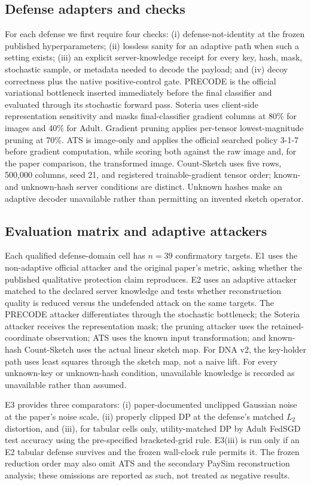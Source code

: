 \subsection{Defense adapters and checks}
For each defense we first require four checks: (i) defense-not-identity at the
frozen published hyperparameters; (ii) lossless sanity for an adaptive path
when such a setting exists; (iii) an explicit server-knowledge receipt for
every key, hash, mask, stochastic sample, or metadata needed to decode the
payload; and (iv) decoy correctness plus the native positive-control gate.
PRECODE is the official variational bottleneck inserted immediately before the
final classifier and evaluated through its stochastic forward pass.  Soteria
uses client-side representation sensitivity and masks final-classifier gradient
columns at 80\% for images and 40\% for Adult.  Gradient pruning applies
per-tensor lowest-magnitude pruning at 70\%.  ATS is image-only and applies the
official searched policy 3-1-7 before gradient computation, while scoring both
against the raw image and, for the paper comparison, the transformed image.
Count-Sketch uses five rows, 500,000 columns, seed 21, and registered
trainable-gradient tensor order; known- and unknown-hash server conditions are
distinct.  Unknown hashes make an adaptive decoder unavailable rather than
permitting an invented sketch operator.

\subsection{Evaluation matrix and adaptive attackers}
Each qualified defense-domain cell has $n=39$ confirmatory targets.  E1 uses
the non-adaptive official attacker and the original paper's metric, asking
whether the published qualitative protection claim reproduces.  E2 uses an
adaptive attacker matched to the declared server knowledge and tests whether
reconstruction quality is reduced versus the undefended attack on the same
targets.  The PRECODE attacker differentiates through the stochastic
bottleneck; the Soteria attacker receives the representation mask; the pruning
attacker uses the retained-coordinate observation; ATS uses the known input
transformation; and known-hash Count-Sketch uses the actual linear sketch map.
For DNA v2, the key-holder path uses least squares through the sketch map, not
a naive lift.  For every unknown-key or unknown-hash condition, unavailable
knowledge is recorded as unavailable rather than assumed.

E3 provides three comparators: (i) paper-documented unclipped Gaussian noise
at the paper's noise scale, (ii) properly clipped DP at the defense's matched
$L_2$ distortion, and (iii), for tabular cells only, utility-matched DP by
Adult FedSGD test accuracy using the pre-specified bracketed-grid rule.  E3(iii)
is run only if an E2 tabular defense survives and the frozen wall-clock rule
permits it.  The frozen reduction order may also omit ATS and the secondary
PaySim reconstruction analysis; these omissions are reported as such, not
treated as negative results.

